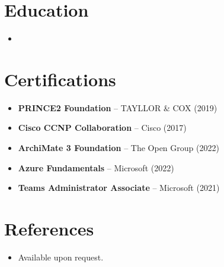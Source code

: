 \documentclass[11pt,a4paper,sans]{moderncv}
\begin{document}
\section{Education}
\vspace{1pt}
\begin{itemize}

\item{}

\end{itemize}

\section{Certifications}
\vspace{1pt}
\begin{itemize}
\item{\textbf{PRINCE2 Foundation} -- TAYLLOR \& COX (2019)}
\item{\textbf{Cisco CCNP Collaboration} -- Cisco (2017)}
\item{\textbf{ArchiMate 3 Foundation} -- The Open Group (2022)}
\item{\textbf{Azure Fundamentals} -- Microsoft (2022)}
\item{\textbf{Teams Administrator Associate} -- Microsoft (2021)}
\end{itemize}

\section{References}
\vspace{1pt}
\begin{itemize}
\item{Available upon request.}
\end{itemize}
\end{document}
